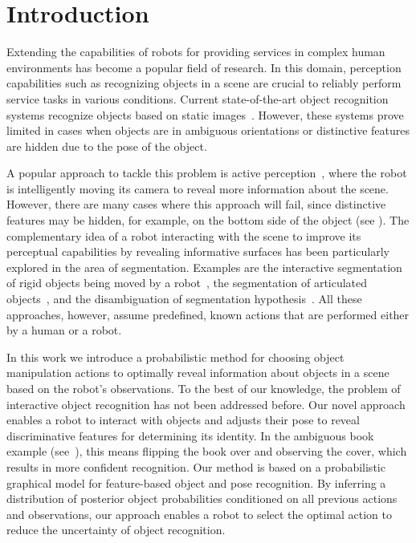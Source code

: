 
\section{Introduction}
    \vspace{-0.5ex}


Extending the capabilities of robots for providing services in complex human environments has become a popular field of research.
In this domain, perception capabilities such as recognizing objects in a scene are crucial to reliably perform service tasks in various conditions.
Current state-of-the-art object recognition systems recognize objects based on static images~\cite{tang2012textured,van2013fusing}.
However, these systems prove limited in cases when objects are in ambiguous orientations or distinctive features are hidden due to the pose of the object.

A popular approach to tackle this problem is active perception~\cite{atanasov2013hypothesis}, where the robot is intelligently moving its camera to reveal more information about the scene.
However, there are many cases where this approach will fail, since distinctive features may be hidden, for example, on the bottom side of the object (see ).
The complementary idea of a robot interacting with the scene to improve its perceptual capabilities by revealing informative surfaces has been particularly explored in the area of segmentation.
Examples are the interactive segmentation of rigid objects being moved by a robot~\cite{KenneyInteractive}, the segmentation of articulated objects~\cite{Katz-WS-MM-ICRA2011}, and the disambiguation of segmentation hypothesis~\cite{bergstrom11icvs}.
All these approaches, however, assume predefined, known actions that are performed either by a human or a robot.

In this work we introduce a probabilistic method for choosing object manipulation actions to optimally reveal information about objects in a scene based on the robot's observations.
To the best of our knowledge, the problem of interactive object recognition has not been addressed before. 
Our novel approach enables a robot to interact with objects and adjusts their pose to reveal discriminative features for determining its identity.
In the ambiguous book example (see~), this means flipping the book over and observing the cover, which results in more confident recognition.
Our method is based on a probabilistic graphical model for feature-based object and pose recognition.
By inferring a distribution of posterior object probabilities conditioned on all previous actions and observations, our approach enables a robot to select the optimal action to reduce the uncertainty of object recognition.

